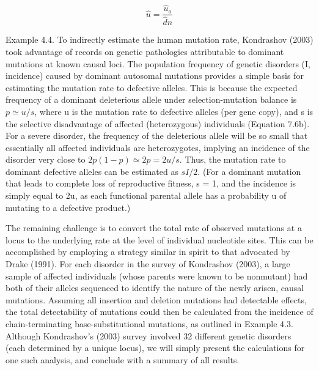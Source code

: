 \documentclass{article}
\begin{document}
\begin{equation}
\widehat{u}=\frac{\widehat{u}_{o}}{\widehat{d}n}
\tag{4.22e}
\label{eq:4_22e}
\end{equation}

Example 4.4. To indirectly estimate the human mutation rate, Kondrashov (2003) took advantage of records on genetic pathologies attributable to dominant mutations at known causal loci. The population frequency of genetic disorders (I, incidence) caused by dominant autosomal mutations provides a simple basis for estimating the mutation rate to defective alleles. This is because the expected frequency of a dominant deleterious allele under selection-mutation balance is  $ p \simeq u/s $, where u is the mutation rate to defective alleles (per gene copy), and s is the selective disadvantage of affected (heterozygous) individuals (Equation 7.6b). For a severe disorder, the frequency of the deleterious allele will be so small that essentially all affected individuals are heterozygotes, implying an incidence of the disorder very close to  $ 2p(1 - p) \simeq 2p = 2u/s $. Thus, the mutation rate to dominant defective alleles can be estimated as  $ sI/2 $. (For a dominant mutation that leads to complete loss of reproductive fitness, s = 1, and the incidence is simply equal to 2u, as each functional parental allele has a probability u of mutating to a defective product.)

The remaining challenge is to convert the total rate of observed mutations at a locus to the underlying rate at the level of individual nucleotide sites. This can be accomplished by employing a strategy similar in spirit to that advocated by Drake (1991). For each disorder in the survey of Kondrashov (2003), a large sample of affected individuals (whose parents were known to be nonmutant) had both of their alleles sequenced to identify the nature of the newly arisen, causal mutations. Assuming all insertion and deletion mutations had detectable effects, the total detectability of mutations could then be calculated from the incidence of chain-terminating base-substitutional mutations, as outlined in Example 4.3. Although Kondrashov's (2003) survey involved 32 different genetic disorders (each determined by a unique locus), we will simply present the calculations for one such analysis, and conclude with a summary of all results.
\end{document}
